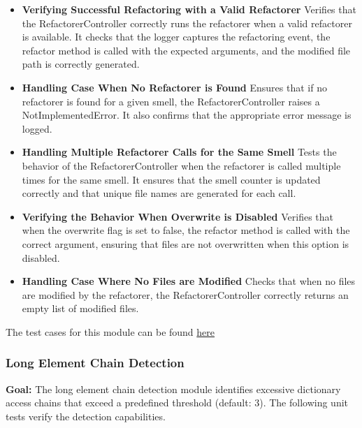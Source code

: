 \documentclass[12pt, titlepage]{article}
\begin{document}
\begin{itemize}
\item \textbf{Verifying Successful Refactoring with a Valid Refactorer} \newline
Verifies that the RefactorerController correctly runs the refactorer when a valid refactorer is available. It checks that the logger captures the refactoring event, the refactor method is called with the expected arguments, and the modified file path is correctly generated.

\item \textbf{Handling Case When No Refactorer is Found} \newline
Ensures that if no refactorer is found for a given smell, the RefactorerController raises a NotImplementedError. It also confirms that the appropriate error message is logged.

\item \textbf{Handling Multiple Refactorer Calls for the Same Smell} \newline
Tests the behavior of the RefactorerController when the refactorer is called multiple times for the same smell. It ensures that the smell counter is updated correctly and that unique file names are generated for each call.

\item \textbf{Verifying the Behavior When Overwrite is Disabled} \newline
Verifies that when the overwrite flag is set to false, the refactor method is called with the correct argument, ensuring that files are not overwritten when this option is disabled.

\item \textbf{Handling Case Where No Files are Modified} \newline
Checks that when no files are modified by the refactorer, the RefactorerController correctly returns an empty list of modified files.
\end{itemize}

\noindent The test cases for this module can be found \href{https://github.com/ssm-lab/capstone--source-code-optimizer/blob/new-poc/tests/controllers/test_refactorer_controller.py}{here}


\subsubsection{Long Element Chain Detection}

\textbf{Goal:} The long element chain detection module identifies excessive dictionary access chains that exceed a predefined threshold (default: 3). The following unit tests verify the detection capabilities. \
\end{document}
